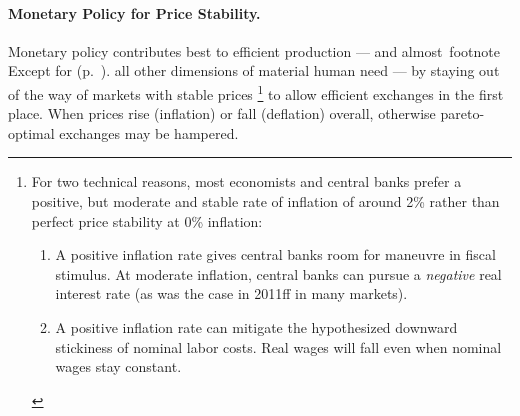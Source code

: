 
\paragraph{Monetary Policy for Price Stability.}  \label{sec:price-stability} Monetary policy contributes best to efficient production --- and almost\
footnote{
	Except for  (p.~\pageref{sec:monetary-stimulus}).
}
all other dimensions of material human need --- by staying out of the way of markets with stable prices
\footnote{
	For two technical reasons, most economists and central banks prefer a positive, but moderate and stable rate of inflation of around 2\% rather than perfect price stability at 0\% inflation:
	\begin{enumerate}
		\item A positive inflation rate gives central banks room for maneuvre in fiscal stimulus.
		At moderate inflation, central banks can pursue a \emph{negative} real interest rate (as was the case in 2011ff in many markets).
		\item A positive inflation rate can mitigate the hypothesized downward stickiness of nominal labor costs.
		Real wages will fall even when nominal wages stay constant.
	\end{enumerate}
}
to allow efficient exchanges in the first place.
When prices rise (inflation) or fall (deflation) overall, otherwise pareto-optimal exchanges may be hampered.

